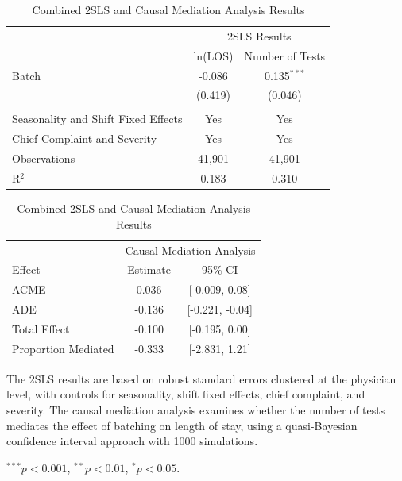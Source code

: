 \documentclass[,,nonblindrev]{informs}
\begin{document}
\begin{table}[!htbp]
\centering
\begin{threeparttable}
\caption{Combined 2SLS and Causal Mediation Analysis Results}
\label{tab:combined_results}
\begin{tabular*}{\textwidth}{@{\extracolsep{\fill}} lcc}
\toprule
& \multicolumn{2}{c}{2SLS Results} \\
\cmidrule{2-3}
& ln(LOS) & Number of Tests \\
\midrule
Batch & -0.086 & 0.135$^{***}$ \\
& (0.419) & (0.046) \\
& & \\
\addlinespace
Seasonality and Shift Fixed Effects & Yes & Yes \\
Chief Complaint and Severity & Yes & Yes \\
\midrule
Observations & 41,901 & 41,901 \\
R$^{2}$ & 0.183 & 0.310 \\
\bottomrule
\end{tabular*}

\smallskip %

\begin{tabular*}{\textwidth}{@{\extracolsep{\fill}} lcc}
\toprule
& \multicolumn{2}{c}{Causal Mediation Analysis} \\
\cmidrule{2-3}
Effect & Estimate & 95\% CI \\
\midrule
ACME & 0.036 & [-0.009, 0.08] \\
ADE & -0.136 & [-0.221, -0.04] \\
Total Effect & -0.100 & [-0.195, 0.00] \\
Proportion Mediated & -0.333 & [-2.831, 1.21] \\
\bottomrule
\end{tabular*}

\begin{tablenotes}
\small
\item The 2SLS results are based on robust standard errors clustered at the physician level, with controls for seasonality, shift fixed effects, chief complaint, and severity. The causal mediation analysis examines whether the number of tests mediates the effect of batching on length of stay, using a quasi-Bayesian confidence interval approach with 1000 simulations.
\item $^{***} p < 0.001$, $^{**} p < 0.01$, $^{*} p < 0.05$.
\end{tablenotes}
\end{threeparttable}
\end{table}
\end{document}
